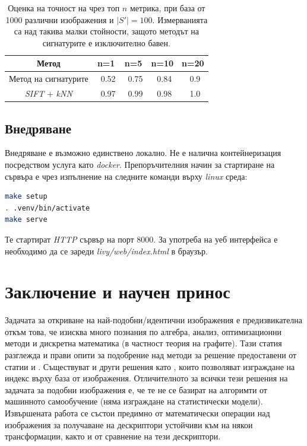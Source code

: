 \documentclass[a4paper,12pt]{article}
\begin{document}
\bigbreak

\begin{table}[h!]
    \centering
    \begin{tabular}{||c c c c c||} 
     \hline
     Метод & n=1 & n=5 & n=10 & n=20 \\ [0.5ex] 
     \hline\hline
     Метод на сигнатурите & ~0.52 & ~0.75 & ~0.84 & ~0.9 \\ 
     \textit{SIFT} + \textit{kNN} & ~0.97 & ~0.99 & ~0.98 & ~1.0 \\ [1ex] 
     \hline
    \end{tabular}
    \caption{Оценка на точност на чрез топ $n$ метрика, при база от 1000 различни изображения и $|S'| = 100$. Измерванията са над такива малки стойности, защото методът на сигнатурите е изключително бавен.}
    \label{table:1}
\end{table}

\subsection{Внедряване}

Внедряване е възможно единствено локално. Не е налична контейнеризация посредством услуга като \textit{docker}. Препоръчителния начин за стартиране на сървъра е чрез изпълнение на следните команди върху \textit{linux} среда:

\begin{lstlisting}[language=bash, caption={Внедряване на сървъра}]
make setup
. .venv/bin/activate
make serve
\end{lstlisting}

\bigbreak

Те стартират \textit{HTTP} сървър на порт $8000$. За употреба на уеб интерфейса е необходимо да се зареди \textit{livy/web/index.html} в браузър.

\section{Заключение и научен принос}

Задачата за откриване на най-подобни/идентични изображения е предизвикателна откъм това, че изисква много познания по алгебра, анализ, оптимизационни методи и дискретна математика (в частност теория на графите). Тази статия разглежда и прави опити за подобрение над методи за решение предоставени от статии \cite{spinimages} и \cite{sift}. Съществуват и други решения като \cite{spinimages}, които позволяват изграждане на индекс върху база от изображения. Отличителното за всички тези решения на задачата за подобни изображения е, че те не се базират на алгоримти от машинното самообучение (няма изграждане на статистически модели). Извършената работа се състои предимно от математически операции над изображения за получаване на дескриптори устойчиви към на някои трансформации, както и от сравнение на тези дескриптори.
\end{document}

